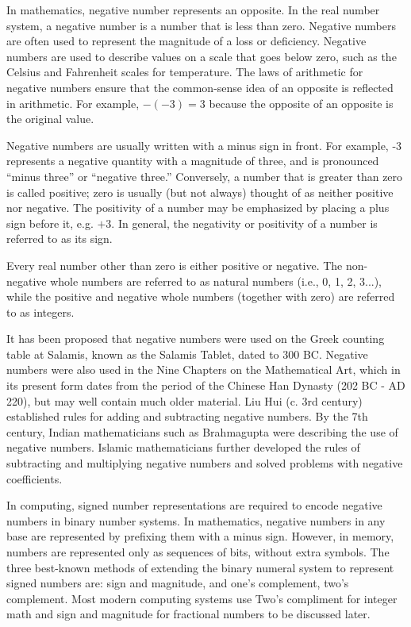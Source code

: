 \documentclass[letterpaper, 12pt]{book}
\begin{document}
In mathematics, negative number represents an opposite. In the real number system, a negative number is a number that is 
less than zero. Negative numbers are often used to represent the magnitude of a loss or deficiency. Negative 
numbers are used to describe values on a scale that goes below zero, such as the Celsius and Fahrenheit scales for 
temperature. The laws of arithmetic for negative numbers ensure that the common-sense idea of an opposite is reflected 
in arithmetic. For example, $-(-3) = 3$ because the opposite of an opposite is the original value.

Negative numbers are usually written with a minus sign in front. For example, -3 represents a negative quantity with a 
magnitude of three, and is pronounced ``minus three'' or ``negative three.'' Conversely, a number that is greater than 
zero is called positive; zero is usually (but not always) thought of as neither positive nor negative. The positivity 
of a number may be emphasized by placing a plus sign before it, e.g. $+3$. In general, the negativity or positivity of 
a number is referred to as its sign.

Every real number other than zero is either positive or negative. The non-negative whole numbers are referred to as 
natural numbers (i.e., 0, 1, 2, 3...), while the positive and negative whole numbers (together with zero) are 
referred to as integers. 

It has been proposed that negative numbers were used on the Greek counting table at Salamis, known as the Salamis Tablet, 
dated to 300 BC. Negative numbers were also used in the Nine Chapters on the Mathematical Art, which in its present form 
dates from the period of the Chinese Han Dynasty (202 BC - AD 220), but may well contain much older material. Liu Hui 
(c. 3rd century) established rules for adding and subtracting negative numbers. By the 7th century, Indian mathematicians 
such as Brahmagupta were describing the use of negative numbers. Islamic mathematicians further developed the rules of 
subtracting and multiplying negative numbers and solved problems with negative coefficients. 

In computing, signed number representations are required to encode negative numbers in binary number systems. In 
mathematics, negative numbers in any base are represented by prefixing them with a minus sign. However, in memory, 
numbers are represented only as sequences of bits, without extra symbols. The three best-known methods of extending the 
binary numeral system to represent signed numbers are: sign and magnitude, and one's complement, two's complement. Most 
modern computing systems use Two's compliment for integer math and sign and magnitude for fractional numbers to be 
discussed later. 
\end{document}
